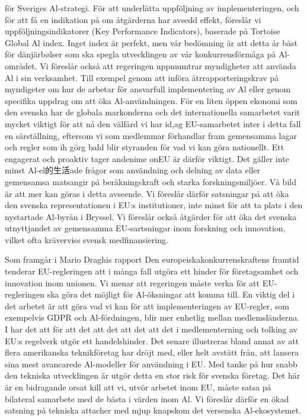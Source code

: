 {för Sveriges Al-strategi. För att underlätta uppföljning av implementeringen, och för att få en indikation på om åtgärderna har avsedd effekt, föreslår vi uppföljningsindikatorer (Key Performance Indicators), baserade på Tortoise Global Al index. Inget index är perfekt, men vår bedömning är att detta år bäst för dänjärbølser som ska spegla utvecklingen av vår konkurrensförmåga på Al-området.
Vi föreslår också att regeringen uppmumtrar myndigheter att använda Al i sin verksamhet. Till exempel genom att införa åtrrapporteringskrav på myndigeter om hur de arbetar för ansvarfull implementering av Al eller genom specifika uppdrag om att öka Al-användningen.
För en liten öppen ekonomi som den svenska har de globala markonderna och det internationella samarbetet varit mycket viktigt för att nå den välfård vi har id,ag EU-samarbetet inter i detta fall en särställning, eftersom vi som medlemmar förhandlar fram gemensamma lagar och regler som ih görg bald blir styranden för vad vi kan göra nationellt. Ett engagerat och proaktiv tager andenime onEU är därför viktigt. Det gäller inte minst Al-el的生活ade frågor som användning och delning av data eller gemensamsa matsangir på beråkningskraft och starka forskningsmiljöer. Vå bild är att mer kan göras i detta avseende. Vi föreslår därför satsningar på att öka den svenska representationen i EU:s institutioner, inte minst för att ta plats i den nystartade Al-byrån i Bryssel. Vi föreslår också åtgärder för att öka det svenska utnyttjandet av gemensamma EU-sartsningar inom forskning och innovation, vilket ofta kräverviss svensk medfinansiering.

Som framgår i Mario Draghis rapport Den europeiskakonkurrenskraftens framtid tenderar EU-regleringen att i många fall utgöra ett hinder för företagsamhet och innovation inom unionen. Vi menar att regeringen måste verka för att EU-regleringen ska göra det möjligt för Al-öksningar att komma till. En viktig del i det arbetet är att göra vad vi kan för att implementeringen av EU-regler, som exempelvis GDPR och Al-fördningen, blir mer enhetlig mellan medlemsländerna. I har det att för att det att det att det att det i medlementerning och tolking av EU:s regelverk utgör ett handelshinder. Det senare illustreras bland annat av att flera amerikanska teknikföretag har dröjt med, eller helt avstätt från, att lansera sina mest avancarede Al-modeller för användning i EU. Med tanke på hur snabb den tekniska utvecklingen är utgör detta en stor risk för svenska företag. Det här är en bidragande orsat kill att vi, utvör arbetet inom EU, måste satsa på bilateral samarbete med de bästa i värden inom Al. Vi föreslår därför en ökad satsning på tekniska attacher med mjup knapskom det versenska Al-ekosystemet.
}
